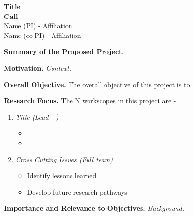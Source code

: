 \documentclass[11pt,letterpaper]{article}
\begin{document}
{\centering 
    \textbf{Title\\
    Call \\
    }
    Name (PI) - Affiliation\\
    Name (co-PI) - Affiliation 
\par
}

\vspace{0.5\baselineskip}

\noindent\textbf{Summary of the Proposed Project.} 

\noindent 

\vspace{0.5\baselineskip}

\noindent\textbf{Motivation.} \textit{Context.} 

\vspace{0.5\baselineskip}

\noindent\textbf{Overall Objective.} The overall objective of this project is to 

\vspace{0.5\baselineskip}

\noindent\textbf{Research Focus.} The N workscopes in this project are - 
\begin{enumerate}[topsep=0pt,itemsep=-1ex,partopsep=1ex,parsep=1ex]
    \item\textit{Title (Lead - )}
        \begin{itemize}[topsep=-1ex,itemsep=-1ex,partopsep=1ex,parsep=1ex]
            \item
            \item
        \end{itemize}
    \item\textit{Cross Cutting Issues (Full team)}
        \begin{itemize}[topsep=-1ex,itemsep=-1ex,partopsep=1ex,parsep=1ex]
            \item Identify lessons learned
            \item Develop future research pathways
        \end{itemize}
\end{enumerate}

\vspace{0.5\baselineskip}

\noindent\textbf{Importance and Relevance to Objectives.} \textit{Background.} 
\end{document}
